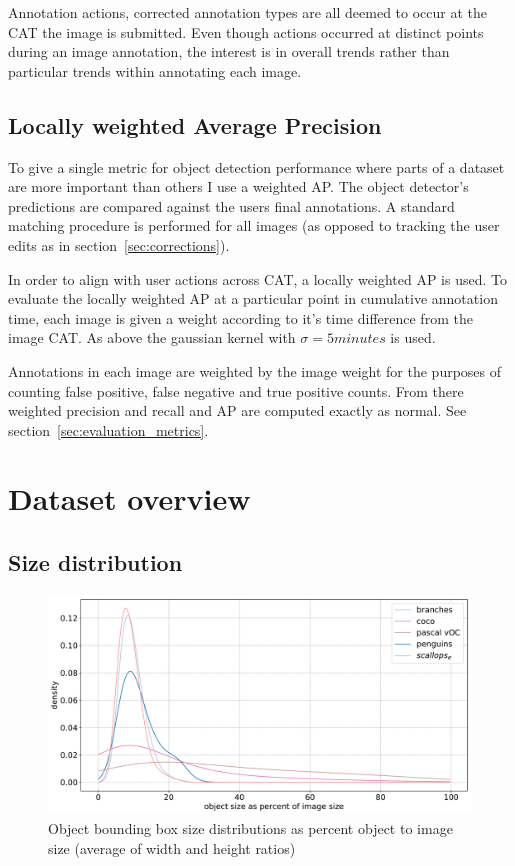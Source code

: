 Annotation actions, corrected annotation types are all deemed to occur at the \gls{CAT} the image is submitted. Even though actions occurred at distinct points during an image annotation, the interest is in overall trends rather than particular trends within annotating each image. 

\subsection {Locally weighted Average Precision}
\label{sec:noisy_trends}

To give a single metric for object detection performance where parts of a dataset are more important than others I use a weighted \gls{AP}. The object detector's predictions are compared against the users final annotations. A standard matching procedure is performed for all images (as opposed to tracking the user edits as in section~\ref{sec:corrections}).

In order to align with user actions across \gls{CAT}, a locally weighted \gls{AP} is used. To evaluate the locally weighted \gls{AP} at a particular point in cumulative annotation time, each image is given a weight according to it's time difference from the image \gls{CAT}. As above the gaussian kernel with $\sigma=5 minutes$ is used.

Annotations in each image are weighted by the image weight for the purposes of counting false positive, false negative and true positive counts. From there weighted precision and recall and \gls{AP} are computed exactly as normal. See section~\ref{sec:evaluation_metrics}.


\section {Dataset overview}
\subsection {Size distribution}

\begin{figure}[ht]
\centering
\includegraphics[width=1.0\linewidth]{charts/summaries/sizes_density.pdf}
\caption{Object bounding box size distributions as percent object to image size (average of width and height ratios) }
\label{fig:box_sizes}
\end{figure}


